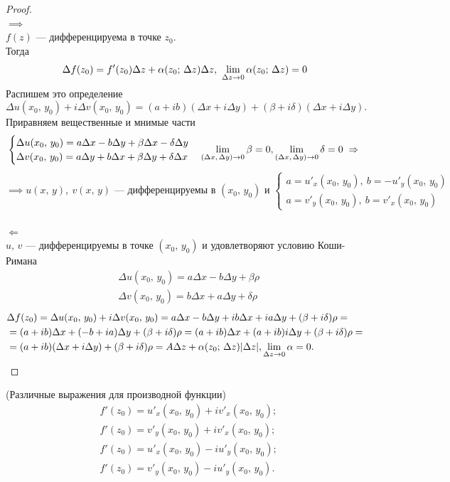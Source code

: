 	\begin{proof}
		\ \\$\boxed\implies$\\
		$ f(z) $ --- дифференцируема в точке $ z_0 $.\\ Тогда 
		\[ \Delta f(z_0) = f'(z_0)\Delta z + \alpha(z_0;\, \Delta z)\Delta z,\ \lim\limits_{\Delta z \to 0}\alpha(z_0;\,\Delta z) = 0 \]
		Распишем это определение
		\[ \Delta u(x_0,\, y_0) + i\Delta v(x_0,\, y_0) = (a + ib)(\Delta x + i\Delta y) + (\beta +i\delta)(\Delta x + i\Delta y). \]
		Приравняем вещественные и мнимые части
		\[
		\begin{cases}
			\Delta u(x_0,\, y_0) = a\Delta x - b\Delta y + \beta\Delta x - \delta\Delta y\\
			\Delta v(x_0,\, y_0) = a\Delta y + b\Delta x + \beta\Delta y + \delta\Delta x
		\end{cases}
		\lim\limits_{(\Delta x,\, \Delta y) \to 0}\beta = 0, 
		\lim\limits_{(\Delta x,\, \Delta y) \to 0}\delta = 0 \;\Rightarrow\;
		\]
		\[ 
		\implies u(x,\, y), \ v(x,\, y) \text{ --- дифференцируемы в } (x_0,\, y_0) \text{ и } 
		\begin{cases}
		  a = u'_x(x_0,\, y_0), \ b = -u'_y(x_0,\, y_0)\\
		  a = v'_y(x_0,\, y_0), \ b = v'_x(x_0,\, y_0)
		\end{cases}
		\]
		\ \\$\boxed\Leftarrow$\\
		$ u,\, v $ --- дифференцируемы в точке $ (x_0,\, y_0) $ и удовлетворяют условию Коши-Римана
		\begin{align*}
			&\Delta u(x_0,\, y_0) = a\Delta x - b\Delta y +\beta \rho\\
			&\Delta v(x_0,\, y_0) = b\Delta x + a\Delta y +\delta \rho
		\end{align*}
		\begin{align*}
			&\Delta f(z_0) = \Delta u(x_0,\, y_0) + i\Delta v(x_0,\, y_0) = a\Delta x - b\Delta y + ib\Delta x + ia\Delta y + (\beta + i\delta)\rho =\\
			&= (a+ib)\Delta x + (-b + ia)\Delta y + (\beta + i\delta)\rho = (a+ib)\Delta x + (a+ib)i\Delta y + (\beta + i\delta)\rho =\\ 
			&= (a+ib)(\Delta x + i\Delta y) + (\beta + i\delta)\rho = A\Delta z + \alpha(z_0;\,\Delta z)|\Delta z|, \lim\limits_{\Delta z \to 0}\alpha = 0.
		\end{align*}
	\end{proof}
	\begin{consequence*}
		(Различные выражения для производной функции)
		\begin{align*}
			&f'(z_0) = u'_x(x_0,\,y_0) + iv'_x(x_0,\,y_0);\\
			&f'(z_0) = v'_y(x_0,\,y_0) + iv'_x(x_0,\,y_0);\\
			&f'(z_0) = u'_x(x_0,\,y_0) - iu'_y(x_0,\,y_0);\\
			&f'(z_0) = v'_y(x_0,\,y_0) - iu'_y(x_0,\,y_0).
		\end{align*}
	\end{consequence*}
	\newpage
